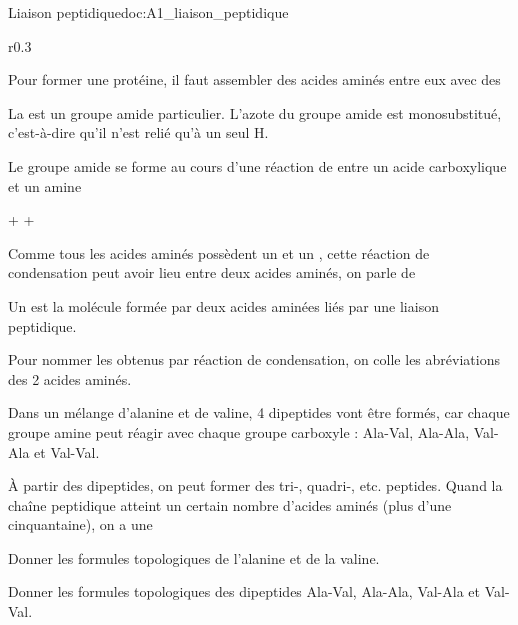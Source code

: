 \begin{doc}{Liaison peptidique}{doc:A1_liaison_peptidique}
  \begin{wrapfigure}[3]{r}{0.3\linewidth}
    \centering

  \end{wrapfigure}
  
  Pour former une protéine, il faut assembler des acides aminés entre eux avec des 

  \begin{encart}
    La  est un groupe amide particulier.
    L'azote du groupe amide est monosubstitué, c'est-à-dire qu'il n'est relié qu'à un seul H.
  \end{encart}

  Le groupe amide se forme au cours d'une réaction de  entre un acide carboxylique et un amine
  \vspace*{-4pt}
  
  \begin{center}
     +   
    \reaction
     +
  \end{center}
  \vspace*{-4pt}

  Comme tous les acides aminés possèdent un  et un , cette réaction de condensation peut avoir lieu entre deux acides aminés, on parle de 

  \begin{encart}
    Un  est la molécule formée par deux acides aminées liés par une liaison peptidique.
    
    Pour nommer les  obtenus par réaction de condensation, on colle les abréviations des 2 acides aminés.
  \end{encart}

  Dans un mélange  d'alanine et de valine, 4 dipeptides vont être formés, car chaque groupe amine peut réagir avec chaque groupe carboxyle :
  Ala-Val, Ala-Ala, Val-Ala et Val-Val.

  \begin{encart}  
    À partir des dipeptides, on peut former des tri-, quadri-, etc. peptides.
    Quand la chaîne peptidique atteint un certain nombre d'acides aminés (plus d'une cinquantaine), on a une 
  \end{encart}
\end{doc}

\numeroQuestion
Donner les formules topologiques de l'alanine et de la valine.
\vspace*{5cm}

\numeroQuestion
Donner les formules topologiques des dipeptides Ala-Val, Ala-Ala, Val-Ala et Val-Val.